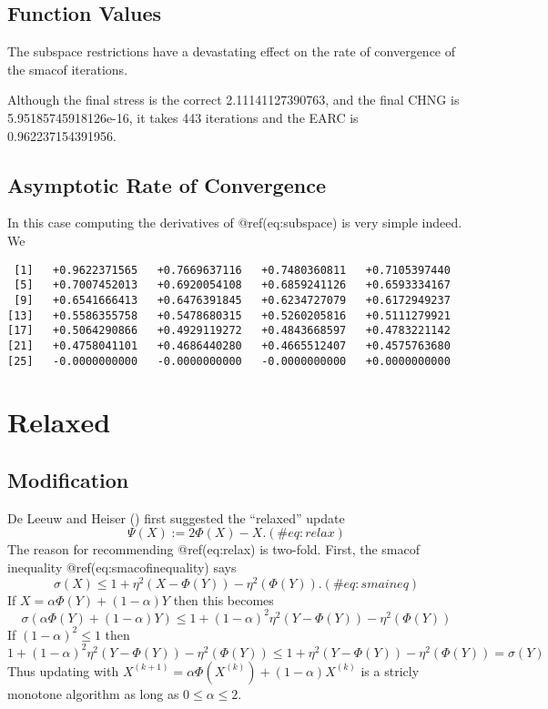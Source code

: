\documentclass[
  12pt,
  letterpaper,
  DIV=11,
  numbers=noendperiod]{scrartcl}
\begin{document}
\subsection{Function Values}\label{function-values-3}

The subspace restrictions have a devastating effect on the rate of
convergence of the smacof iterations.

Although the final stress is the correct 2.11141127390763, and the final
CHNG is 5.95185745918126e-16, it takes 443 iterations and the EARC is
0.962237154391956.

\subsection{Asymptotic Rate of
Convergence}\label{asymptotic-rate-of-convergence-3}

In this case computing the derivatives of @ref(eq:subspace) is very
simple indeed. We

\begin{verbatim}
 [1]   +0.9622371565   +0.7669637116   +0.7480360811   +0.7105397440
 [5]   +0.7007452013   +0.6920054108   +0.6859241126   +0.6593334167
 [9]   +0.6541666413   +0.6476391845   +0.6234727079   +0.6172949237
[13]   +0.5586355758   +0.5478680315   +0.5260205816   +0.5111279921
[17]   +0.5064290866   +0.4929119272   +0.4843668597   +0.4783221142
[21]   +0.4758041101   +0.4686440280   +0.4665512407   +0.4575763680
[25]   -0.0000000000   -0.0000000000   -0.0000000000   +0.0000000000
\end{verbatim}

\section{Relaxed}\label{relaxed}

\subsection{Modification}\label{modification-3}

De Leeuw and Heiser () first
suggested the ``relaxed'' update \begin{equation}
\Psi(X):=2\Phi(X)-X.
(\#eq:relax)
\end{equation} The reason for recommending @ref(eq:relax) is two-fold.
First, the smacof inequality @ref(eq:smacofinequality) says
\begin{equation}
\sigma(X)\leq 1+\eta^2(X-\Phi(Y))-\eta^2(\Phi(Y)).
(\#eq:smaineq)
\end{equation} If \(X=\alpha\Phi(Y)+(1-\alpha)Y\) then this becomes
\begin{equation}
\sigma(\alpha\Phi(Y)+(1-\alpha)Y)\leq 1+(1-\alpha)^2\eta^2(Y-\Phi(Y))-\eta^2(\Phi(Y))
\end{equation} If \((1-\alpha)^2\leq 1\) then \begin{equation}
1+(1-\alpha)^2\eta^2(Y-\Phi(Y))-\eta^2(\Phi(Y))\leq 1+\eta^2(Y-\Phi(Y))-\eta^2(\Phi(Y))=\sigma(Y)
\end{equation} Thus updating with
\(X^{(k+1)}=\alpha\Phi(X^{(k)})+(1-\alpha)X^{(k)}\) is a stricly
monotone algorithm as long as \(0\leq\alpha\leq 2\).
\end{document}
